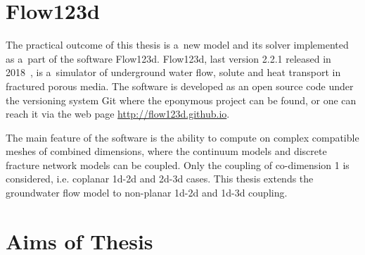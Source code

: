 \section{Flow123d}
\label{sec:soa_flow123d}

The practical outcome of this thesis is a~new model and its solver implemented as a~part of the software Flow123d.
Flow123d, last version 2.2.1 released in 2018~\cite{flow123d}, is a~simulator of underground water flow, solute
and heat transport in fractured porous media.
The software is developed as an open source code under the versioning system Git where the eponymous project can be found, or 
one can reach it via the web page \url{http://flow123d.github.io}.
%

The main feature of the software is the ability to compute on complex compatible meshes of combined dimensions,
where the continuum models and discrete fracture network models can be coupled. Only the coupling of co-dimension 1
is considered, i.e. coplanar 1d-2d and 2d-3d cases.
This thesis extends the groundwater flow model to non-planar 1d-2d and 1d-3d coupling.
%




\section{Aims of Thesis}\label{chap:aims}

